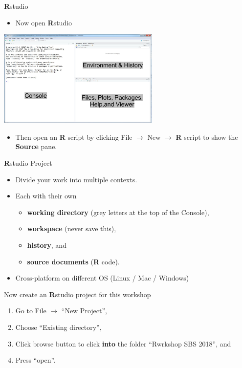 \documentclass[ignorenonframetext,]{beamer}
\providecommand{\tightlist}{%
  \setlength{\itemsep}{0pt}\setlength{\parskip}{0pt}}
\begin{document}
\begin{frame}{\textbf{R}studio}

\begin{itemize}
\tightlist
\item
  Now open \textbf{R}studio
\end{itemize}

\center \includegraphics[width=8.00000cm]{Figure/rstudio.png}

\begin{itemize}
\tightlist
\item
  Then open an \textbf{R} script by clicking File \(\rightarrow\) New
  \(\rightarrow\) \textbf{R} script to show the \textbf{Source} pane.
\end{itemize}

\end{frame}

\begin{frame}{\textbf{R}studio Project}

\begin{itemize}
\item
  Divide your work into multiple contexts.
\item
  Each with their own

  \begin{itemize}
  \tightlist
  \item
    \textbf{working directory} (grey letters at the top of the Console),
  \item
    \textbf{workspace} (never save this),
  \item
    \textbf{history}, and
  \item
    \textbf{source documents} (\textbf{R} code).
  \end{itemize}
\item
  Cross-platform on different OS (Linux / Mac / Windows)
\end{itemize}

\begin{block}{Now create an \textbf{R}studio project for this workshop}

\begin{enumerate}
\def\labelenumi{\arabic{enumi}.}
\tightlist
\item
  Go to File \(\rightarrow\) ``New Project'',
\item
  Choose ``Existing directory'',
\item
  Click browse button to click \textbf{into} the folder ``Rwrkshop SBS
  2018'', and
\item
  Press ``open''.
\end{enumerate}

\end{block}

\end{frame}
\end{document}
